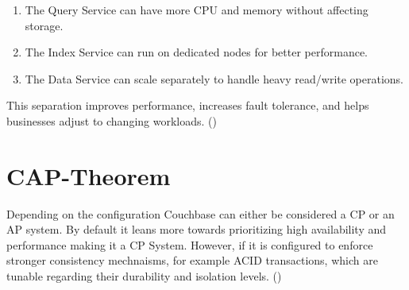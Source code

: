 \begin{enumerate}
    \item The Query Service can have more CPU and memory without affecting storage.
    \item The Index Service can run on dedicated nodes for better performance.
    \item The Data Service can scale separately to handle heavy read/write operations.
  \end{enumerate}
This separation improves performance, increases fault tolerance, and helps businesses adjust to changing workloads.
(\cite{CouchbaseMultiDimensionalScaling})

\section{CAP-Theorem}
Depending on the configuration Couchbase can either be considered a CP or an AP system. By default it leans more towards prioritizing high availability and performance making it a CP System. However, if it is configured to enforce stronger consistency mechnaisms, for example ACID transactions, which are tunable regarding their durability and isolation levels. 
(\cite{couchbaseCAP})